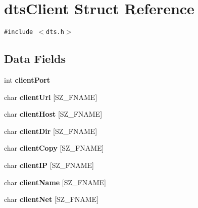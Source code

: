 \hypertarget{structdtsClient}{
\section{dtsClient Struct Reference}
\label{structdtsClient}
}
{\tt \#include $<$dts.h$>$}

\subsection*{Data Fields}
\begin{CompactItemize}
\item 
\hypertarget{structdtsClient_bc08cfd752e9be27bb1b63a3fc917b6e}{
int \textbf{clientPort}}
\label{structdtsClient_bc08cfd752e9be27bb1b63a3fc917b6e}

\item 
\hypertarget{structdtsClient_aa89f3610d4d368096694affe1d5b06c}{
char \textbf{clientUrl} \mbox{[}SZ\_\-FNAME\mbox{]}}
\label{structdtsClient_aa89f3610d4d368096694affe1d5b06c}

\item 
\hypertarget{structdtsClient_740ed77bc11979a4bb0b480bf52b7db6}{
char \textbf{clientHost} \mbox{[}SZ\_\-FNAME\mbox{]}}
\label{structdtsClient_740ed77bc11979a4bb0b480bf52b7db6}

\item 
\hypertarget{structdtsClient_2f294c6b64ff080b2d36ada3f8fd6e6e}{
char \textbf{clientDir} \mbox{[}SZ\_\-FNAME\mbox{]}}
\label{structdtsClient_2f294c6b64ff080b2d36ada3f8fd6e6e}

\item 
\hypertarget{structdtsClient_4ad4ca5142820fe0753aa65729b9846e}{
char \textbf{clientCopy} \mbox{[}SZ\_\-FNAME\mbox{]}}
\label{structdtsClient_4ad4ca5142820fe0753aa65729b9846e}

\item 
\hypertarget{structdtsClient_0bae9b9912ed846be5a85a992ab0b680}{
char \textbf{clientIP} \mbox{[}SZ\_\-FNAME\mbox{]}}
\label{structdtsClient_0bae9b9912ed846be5a85a992ab0b680}

\item 
\hypertarget{structdtsClient_b10a0230d4bdfa10eba5526b766127e7}{
char \textbf{clientName} \mbox{[}SZ\_\-FNAME\mbox{]}}
\label{structdtsClient_b10a0230d4bdfa10eba5526b766127e7}

\item 
\hypertarget{structdtsClient_f173c0b1404f9afb5c5cb89b37781945}{
char \textbf{clientNet} \mbox{[}SZ\_\-FNAME\mbox{]}}
\label{structdtsClient_f173c0b1404f9afb5c5cb89b37781945}


\end{CompactItemize}
